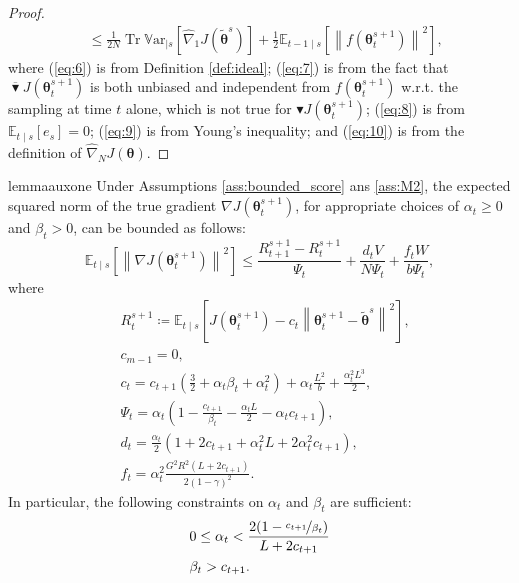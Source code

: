 \documentclass{article}
\makeatletter
\theoremstyle{remark}
\theoremstyle{definition}
\DeclareRobustCommand{\wrt}{w.r.t.\@\xspace}
\DeclareMathOperator{\Tr}{Tr}
\newcommand{\norm}[2][\infty]{\left\|#2\right\|_{#1}}
\newcommand{\vtheta}{\boldsymbol{\theta}}
\newcommand{\gradJ}[1]{\nabla J(#1)}
\newcommand{\gradApp}[2]{\hat{\nabla}_{#2}J(#1)}
\newcommand{\Ets}[2][t]{\mathbb{E}_{#1\mid s}\left[#2\right]}
\newcommand{\Varts}[2][t]{{\mathbb{V}\text{ar}}_{#1\mid s}\left[#2\right]}
\newcommand{\gradBlack}[1]{\blacktriangledown J(#1)}
\newcommand{\gradIdeal}[1]{\overline{\blacktriangledown} J(#1)}
\makeatother
\begin{document}
\begin{proof}
\begin{align}
	&\leq
	\frac{1}{2N}\Tr\Varts[]{\gradApp{\tilde{\vtheta}^s}{1}} +\frac{1}{2}\Ets[t-1]{\norm[]{f(\vtheta_t^{s+1})}^2},
	\nonumber
\end{align}
where (\ref{eq:6}) is from Definition \ref{def:ideal}; (\ref{eq:7}) is from the fact that $\gradIdeal{\vtheta_t^{s+1}}$ is both unbiased and independent from $f(\vtheta_t^{s+1})$ \wrt the sampling at time $t$ alone, which is not true for $\gradBlack{\vtheta_t^{s+1}}$; (\ref{eq:8}) is from $\Ets{e_s}=0$; (\ref{eq:9}) is from Young's inequality; and (\ref{eq:10}) is from the definition of $\gradApp{\vtheta}{N}$.
\end{proof}

\begin{restatable}[]{lemma}{auxone}\label{lemma:aux1}
Under Assumptions \ref{ass:bounded_score} ans \ref{ass:M2}, the expected squared norm of the true gradient $\gradJ{\vtheta_t^{s+1}}$, for appropriate choices of $\alpha_t\geq0$ and $\beta_t>0$, can be bounded as follows:
\[
	\Ets{\norm[]{\gradJ{\vtheta_t^{s+1}}}^2} \leq
	\frac{R_{t+1}^{s+1} - R_t^{s+1}}{\Psi_t} + \frac{d_tV}{N\Psi_t}
	+\frac{f_tW}{b\Psi_t},
\]
	where
\begin{align*}
	&R_t^{s+1}\coloneqq \Ets{J(\vtheta_t^{s+1}) - c_t\norm[]{\vtheta_t^{s+1}-\tilde{\vtheta}^s}^2}, \\
	&c_{m-1} = 0, \\
	&c_t = c_{t+1}\left(\frac{3}{2}+\alpha_t\beta_t+\alpha_t^2\right) + \alpha_t\frac{L^2}{b}+\frac{\alpha_t^2L^3}{2}, \\
	&\Psi_t = \alpha_t\left(1-\frac{c_{t+1}}{\beta_t}-\frac{\alpha_tL}{2}-\alpha_tc_{t+1}\right), \\
	&d_t = \frac{\alpha_t}{2}\left(1+2c_{t+1}+\alpha_t^2L+2\alpha_t^2c_{t+1}\right), \\
	&f_t = \alpha_t^2\frac{G^2R^2(L+2c_{t+1})}{2(1-\gamma)^2}.
\end{align*}
In particular, the following constraints on $\alpha_t$ and $\beta_t$ are sufficient:
\begin{align*}
&0\leq\alpha_t < \frac{2(1-\nicefrac{c_{t+1}}{\beta_t})}{L+2c_{t+1}} \\
&\beta_t > c_{t+1}.
\end{align*}
\end{restatable}
\end{document}
